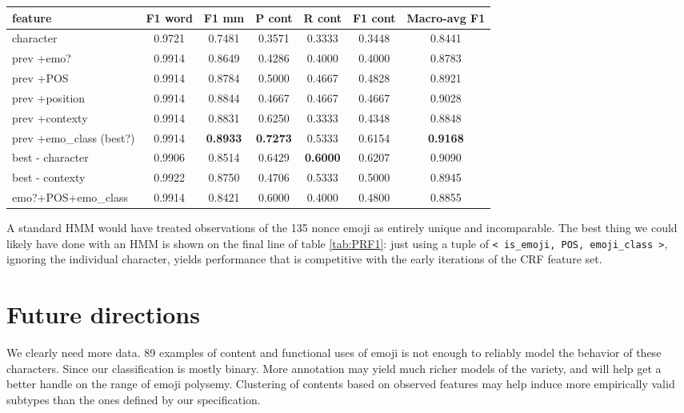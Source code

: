 \documentclass[11pt]{article}
\begin{document}
\begin{table*}[htp]
\caption{Performance of feature iterations}
\begin{center}
\begin{tabular}{|l| c c c c c c|}
\hline
feature                 & F1 word   & F1 mm  & P cont & R cont   & F1 cont & Macro-avg F1 \\\hline
character               & 0.9721    & 0.7481 & 0.3571 & 0.3333   & 0.3448  & 0.8441\\
 prev +emo?         & 0.9914    & 0.8649 & 0.4286 & 0.4000   & 0.4000  & 0.8783\\
 prev +POS              & 0.9914    & 0.8784 & 0.5000 & 0.4667   & 0.4828  & 0.8921\\
 prev +position         & 0.9914    & 0.8844 & 0.4667 & 0.4667   & 0.4667  & 0.9028\\
 prev +contexty         & 0.9914    & 0.8831 & 0.6250 & 0.3333   & 0.4348  & 0.8848\\
prev +emo\_class (best?)& 0.9914    & \textbf{0.8933} & \textbf{0.7273} & 0.5333   & 0.6154  & \textbf{0.9168}\\
best - character        & 0.9906    & 0.8514 & 0.6429 & \textbf{0.6000}   & 0.6207  & 0.9090\\
best - contexty         & 0.9922    & 0.8750 & 0.4706 & 0.5333   & 0.5000  & 0.8945\\
emo?+POS+emo\_class & 0.9914 & 0.8421 & 0.6000 & 0.4000 & 0.4800 & 0.8855\\
\hline
\end{tabular}
\end{center}
\label{tab:PRF1}
\end{table*}

A standard HMM would have treated observations of the 135 nonce emoji as entirely unique and incomparable. The best thing we could likely have done with an HMM is shown on the final line of table \ref{tab:PRF1}: just using a tuple of \texttt{< is\_emoji, POS, emoji\_class >}, ignoring the individual character, yields performance that is competitive with the early iterations of the CRF feature set.


\section{Future directions}

We clearly need more data. 89 examples of content and functional uses of emoji is not enough to reliably model the behavior of these characters. Since our
classification is mostly binary. More annotation may yield much richer models of the variety, and will help get a better handle on the range of emoji polysemy.
Clustering of contents based on observed features may help induce more empirically valid subtypes than the ones defined by our specification.
\end{document}
